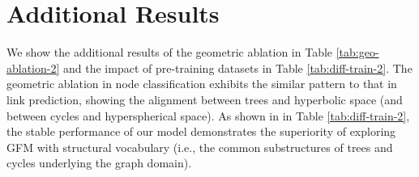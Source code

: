 \section{Additional Results}
We show the additional results of the geometric ablation in Table \ref{tab:geo-ablation-2} and the impact of pre-training datasets in Table  \ref{tab:diff-train-2}.
The geometric ablation in node classification exhibits the similar pattern to that in link prediction, showing the alignment between trees and hyperbolic space  (and between cycles and hyperspherical space).
As shown in in Table \ref{tab:diff-train-2}, the stable performance of our model demonstrates the superiority of exploring GFM with structural vocabulary (i.e., the common substructures of trees and cycles underlying the graph domain).



